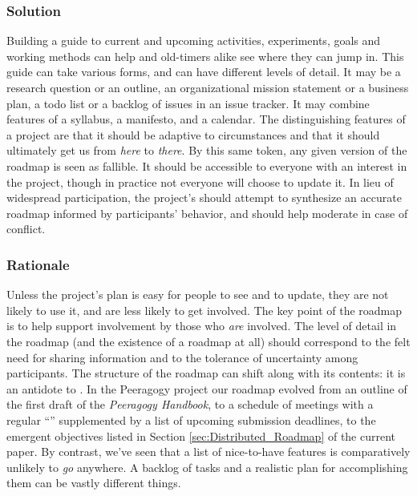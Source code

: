 \subsubsection*{Solution} Building a guide to current and upcoming activities, experiments, goals and working methods can help  and old-timers alike see where they can jump in.  This guide can take various forms, and can have different levels of detail.  It may be a research question or an outline, an organizational mission statement or a business plan, a todo list or a backlog of issues in an issue tracker.  It may combine features of a syllabus, a manifesto, and a calendar.  The distinguishing features of a project  are that it should be adaptive to circumstances and that it should ultimately get us from \emph{here} to \emph{there}.  By this same token, any given version of the roadmap is seen as fallible.  It should be accessible to everyone with an interest in the project, though in practice not everyone will choose to update it.  In lieu of widespread participation, the project's  should attempt to synthesize an accurate roadmap informed by participants' behavior, and should help moderate in case of conflict.

\subsubsection*{Rationale} Unless the project's plan is easy for people to see and to update, they are not likely to use it, and are less likely to get involved.  The key point of the roadmap is to help support involvement by those who \emph{are} involved.   The level of detail in the roadmap (and the existence of a roadmap at all) should correspond to the felt need for sharing information and to the tolerance of uncertainty among participants.
The structure of the roadmap can shift along with its contents: it is an antidote to  \cite[pp. 121--124]{david2001software}. 
In the Peeragogy project our roadmap evolved from an outline of the first draft of the
\emph{Peeragogy Handbook}, to a schedule of meetings with a regular
``'' supplemented by a list of upcoming submission deadlines, to the emergent objectives listed in Section \ref{sec:Distributed_Roadmap} of the current paper.
By contrast, we've seen that a list of nice-to-have features is comparatively
unlikely to \emph{go} anywhere.  A backlog of tasks and a realistic
plan for accomplishing them can be vastly different things.

